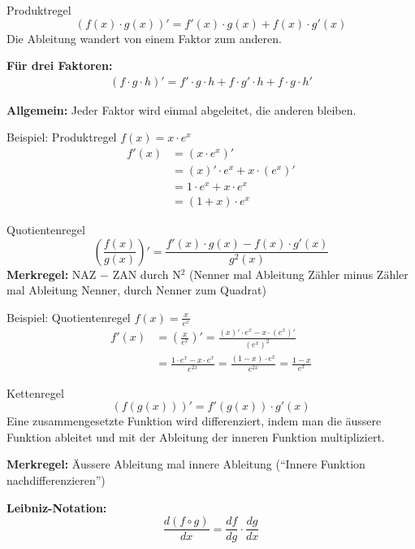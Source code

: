 \documentclass[a4paper,fontsize = 7pt]{scrartcl}
\begin{document}
\begin{mainbox}{Produktregel}
$$(f(x) \cdot g(x))' = f'(x) \cdot g(x) + f(x) \cdot g'(x)$$
Die Ableitung wandert von einem Faktor zum anderen.

\textbf{Für drei Faktoren:}
\begin{align*}
(f \cdot g \cdot h)' = f' \cdot g \cdot h + f \cdot g' \cdot h + f \cdot g \cdot h'
\end{align*}

\textbf{Allgemein:} Jeder Faktor wird einmal abgeleitet, die anderen bleiben.
\end{mainbox}

\begin{subbox}{Beispiel: Produktregel}
	$f(x) = x \cdot e^x$
	\begin{align*}
		f'(x) &= (x \cdot e^x)' \\
		&= (x)' \cdot e^x + x \cdot (e^x)' \\
		&= 1 \cdot e^x + x \cdot e^x \\
		&= (1 + x) \cdot e^x
	\end{align*}
\end{subbox}

\begin{mainbox}{Quotientenregel}
$$\left(\frac{f(x)}{g(x)}\right)' = \frac{f'(x) \cdot g(x) - f(x) \cdot g'(x)}{g^2(x)}$$
\textbf{Merkregel:} NAZ $-$ ZAN durch N$^2$ (Nenner mal Ableitung Zähler minus Zähler mal Ableitung Nenner, durch Nenner zum Quadrat)
\end{mainbox}

\begin{subbox}{Beispiel: Quotientenregel}
	$f(x) = \frac{x}{e^x}$
	\begin{align*}
		f'(x) &= \left(\frac{x}{e^x}\right)' = \frac{(x)' \cdot e^x - x \cdot (e^x)'}{(e^x)^2} \\
		&= \frac{1 \cdot e^x - x \cdot e^x}{e^{2x}} = \frac{(1-x) \cdot e^x}{e^{2x}} = \frac{1-x}{e^x}
	\end{align*}
\end{subbox}

\begin{mainbox}{Kettenregel}
$$(f(g(x)))' = f'(g(x)) \cdot g'(x)$$
Eine zusammengesetzte Funktion wird differenziert, indem man die äussere Funktion ableitet und mit der Ableitung der inneren Funktion multipliziert.

\textbf{Merkregel:} Äussere Ableitung mal innere Ableitung (``Innere Funktion nachdifferenzieren'')

\textbf{Leibniz-Notation:}
$$\frac{d(f \circ g)}{dx} = \frac{df}{dg} \cdot \frac{dg}{dx}$$
\end{mainbox}
\end{document}
